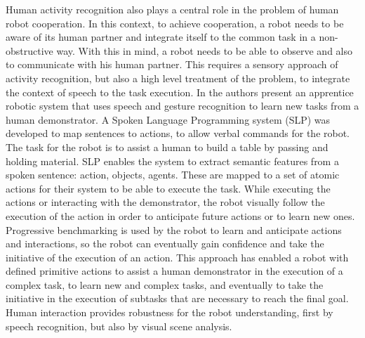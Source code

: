 Human activity recognition also plays a central role in the problem of human robot cooperation.
In this context, to achieve cooperation, a robot needs to  be aware of its human partner and integrate itself to the common task in a non-obstructive way.
With this in mind, a robot needs to be able to observe and also to communicate with his human partner.
This requires a sensory approach of activity recognition, but also a high level treatment of the problem, to integrate the context of speech to the task execution.
In \citep{Lalle2010_HRI} the authors present an apprentice robotic system that uses speech and gesture recognition to learn new tasks from a human demonstrator. 
A Spoken Language Programming system (SLP) was developed \citep{Dominey2007_RTCBA} to map sentences to actions, to allow verbal commands for the robot.
The task for the robot is to assist a human to build a table by passing and holding material.
SLP enables the system to extract semantic features from a spoken sentence: action, objects, agents. %
These are mapped to a set of atomic actions for their system to be able to execute the task.
While executing the actions or interacting with the demonstrator, the robot visually follow the execution of the action in order to anticipate future actions or to learn new ones.
Progressive benchmarking is used by the robot to learn and anticipate actions and interactions, so the robot can eventually gain confidence and take the initiative of the execution of an action.
This approach has enabled a robot with defined primitive actions to assist a human demonstrator in the execution of a complex task, to learn new and complex tasks, and eventually to take the initiative in the execution of subtasks that are necessary to reach the final goal.
Human interaction provides robustness for the robot understanding, first by speech recognition, but also by visual scene analysis.

